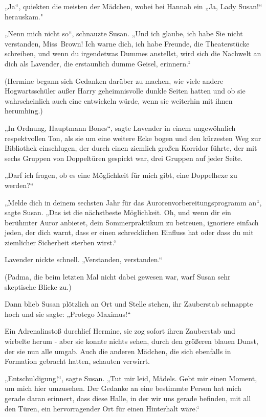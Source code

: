 {„Ja“, quiekten die meisten der Mädchen, wobei bei Hannah ein „Ja, Lady Susan!“ herauskam."

„Nenn mich nicht so“, schnauzte Susan. „Und ich glaube, ich habe Sie nicht verstanden, Miss~Brown! Ich warne dich, ich habe Freunde, die Theaterstücke schreiben, und wenn du irgendetwas Dummes anstellst, wird sich die Nachwelt an dich als Lavender, die erstaunlich dumme Geisel, erinnern.“

(Hermine begann sich Gedanken darüber zu machen, wie viele andere Hogwartsschüler außer Harry geheimnisvolle dunkle Seiten hatten und ob sie wahrscheinlich auch eine entwickeln würde, wenn sie weiterhin mit ihnen herumhing.)

„In Ordnung, Hauptmann Bones“, sagte Lavender in einem ungewöhnlich respektvollen Ton, als sie um eine weitere Ecke bogen und den kürzesten Weg zur Bibliothek einschlugen, der durch einen ziemlich großen Korridor führte, der mit sechs Gruppen von Doppeltüren gespickt war, drei Gruppen auf jeder Seite.

„Darf ich fragen, ob es eine Möglichkeit für mich gibt, eine Doppelhexe zu werden?“

„Melde dich in deinem sechsten Jahr für das Aurorenvorbereitungsprogramm an“, sagte Susan. „Das ist die nächstbeste Möglichkeit. Oh, und wenn dir ein berühmter Auror anbietet, dein Sommerpraktikum zu betreuen, ignoriere einfach jeden, der dich warnt, dass er einen schrecklichen Einfluss hat oder dass du mit ziemlicher Sicherheit sterben wirst.“

Lavender nickte schnell. „Verstanden, verstanden.“

(Padma, die beim letzten Mal nicht dabei gewesen war, warf Susan sehr skeptische Blicke zu.)

Dann blieb Susan plötzlich an Ort und Stelle stehen, ihr Zauberstab schnappte hoch und sie sagte: „Protego Maximus!“

Ein Adrenalinstoß durchlief Hermine, sie zog sofort ihren Zauberstab und wirbelte herum - aber sie konnte nichts sehen, durch den größeren blauen Dunst, der sie nun alle umgab. Auch die anderen Mädchen, die sich ebenfalls in Formation gebracht hatten, schauten verwirrt.

„Entschuldigung!“, sagte Susan. „Tut mir leid, Mädels. Gebt mir einen Moment, um mich hier umzusehen. Der Gedanke an eine bestimmte Person hat mich gerade daran erinnert, dass diese Halle, in der wir uns gerade befinden, mit all den Türen, ein hervorragender Ort für einen Hinterhalt wäre.“

}
